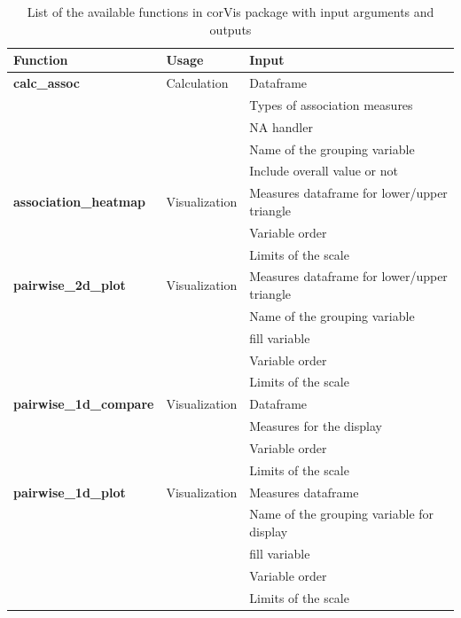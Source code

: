 \begin{Schunk}
\begin{table}

\caption{\label{tab:function-corVis}List of the available functions in corVis package with input arguments and outputs}
\centering
\begin{tabular}[t]{>{}lll}
\toprule
Function & Usage & Input\\
\midrule
\textbf{calc\_assoc} & Calculation & Dataframe\\
\textbf{} &  & Types of association measures\\
\textbf{} &  & NA handler\\
\textbf{} &  & Name of the grouping \vphantom{1} variable\\
\textbf{} &  & Include overall value or not\\
\addlinespace
\textbf{association\_heatmap} & Visualization & Measures dataframe for lower/upper triangle\\
\textbf{} &  & Variable \vphantom{3} order\\
\textbf{} &  & Limits of the \vphantom{3} scale\\
\textbf{pairwise\_2d\_plot} & Visualization & Measures dataframe for lower/upper triangle\\
\textbf{} &  & Name of the grouping variable\\
\addlinespace
\textbf{} &  & fill \vphantom{1} variable\\
\textbf{} &  & Variable \vphantom{2} order\\
\textbf{} &  & Limits of the \vphantom{2} scale\\
\textbf{pairwise\_1d\_compare} & Visualization & Dataframe\\
\textbf{} &  & Measures for the display\\
\addlinespace
\textbf{} &  & Variable \vphantom{1} order\\
\textbf{} &  & Limits of the \vphantom{1} scale\\
\textbf{pairwise\_1d\_plot} & Visualization & Measures dataframe\\
\textbf{} &  & Name of the grouping variable for display\\
\textbf{} &  & fill variable\\
\addlinespace
\textbf{} &  & Variable order\\
\textbf{} &  & Limits of the scale\\
\bottomrule
\end{tabular}
\end{table}

\end{Schunk}

